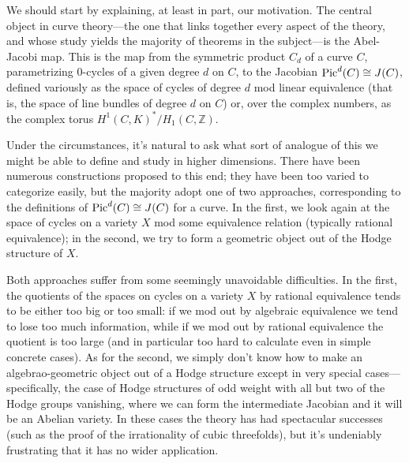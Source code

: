 \documentclass[amssymb,twoside,12 pt,amscd,reqno]{amsart}
\theoremstyle{plain}
\theoremstyle{definition}
\def\pic{{\rm Pic}}
\def\Z{{\mathbb Z}}
\def\ps{\vspace{4pt}}
\begin{document}
We should start by explaining, at least in part, our motivation. The
central object in curve theory---the one that links together every
aspect of the theory, and whose study yields the majority of theorems
in the subject---is the Abel-Jacobi map. This is the map from the
symmetric product $C_d$ of a curve $C$, parametrizing $0$-cycles of a
given degree $d$ on $C$, to the Jacobian $\pic^d(C) \cong J(C)$,
defined variously as the space of cycles of degree $d$ mod linear
equivalence (that is, the space of line bundles of degree $d$ on $C$)
or, over the complex numbers, as the complex torus
$H^1(C,K)^*/H_1(C,\Z)$.

\ps

Under the circumstances, it's natural to ask what sort of analogue of
this we might be able to define and study in higher dimensions. There
have been numerous constructions proposed to this end; they have been
too varied to categorize easily, but the majority adopt one of two
approaches, corresponding to the definitions of $\pic^d(C) \cong J(C)$
for a curve. In the first, we look again at the space of cycles on a
variety $X$ mod some equivalence relation (typically rational
equivalence); in the second, we try to form a geometric object out of
the Hodge structure of $X$.

\ps

Both approaches suffer from some seemingly unavoidable
difficulties. In the first, the quotients of the spaces on cycles on a
variety $X$ by rational equivalence tends to be either too big or too
small: if we mod out by algebraic equivalence we tend to lose too much
information, while if we mod out by rational equivalence the quotient
is too large (and in particular too hard to calculate even in simple
concrete cases).  As for the second, we simply don't know how to make
an algebrao-geometric object out of a Hodge structure except in very
special cases---specifically, the case of Hodge structures of odd
weight with all but two of the Hodge groups vanishing, where we can
form the intermediate Jacobian and it will be an Abelian variety. In
these cases the theory has had spectacular successes (such as the
proof of the irrationality of cubic threefolds), but it's undeniably
frustrating that it has no wider application.

\ps
\end{document}
